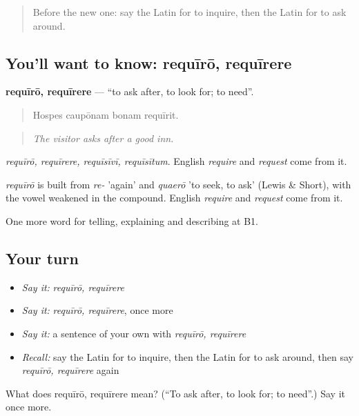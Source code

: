 \begin{quote}
Before the new one: say the Latin for to inquire, then the Latin for to ask around.
\end{quote}

\subsection*{You'll want to know: requīrō, requīrere}
\textbf{requīrō, requīrere} — \textquotedblleft{}to ask after, to look for; to need\textquotedblright{}.

\begin{quote}
Hospes caupōnam bonam requīrit.
\end{quote}

\begin{quote}
\emph{The visitor asks after a good inn.}
\end{quote}

\emph{requīrō, requīrere, requīsīvī, requīsītum}. English \emph{require} and \emph{request} come from it.

\begin{cousinweb}
\emph{requīrō} is built from \emph{re-} 'again' and \emph{quaerō} 'to seek, to ask' (Lewis \& Short), with the vowel weakened in the compound. English \emph{require} and \emph{request} come from it.
\end{cousinweb}

\begin{grammarlens}[title={What you've built}]
One more word for telling, explaining and describing at B1.
\end{grammarlens}

\subsection*{Your turn}
\begin{itemize}
\raggedright
  \item \emph{Say it:} \emph{requīrō, requīrere}
  \item \emph{Say it:} \emph{requīrō, requīrere}, once more
  \item \emph{Say it:} a sentence of your own with \emph{requīrō, requīrere}
  \item \emph{Recall:} say the Latin for to inquire, then the Latin for to ask around, then say \emph{requīrō, requīrere} again
\end{itemize}

\begin{tcolorbox}[breakable,colback=teal!4,colframe=teal!35!black,title={Before you move on}]
What does requīrō, requīrere mean? (\textquotedblleft{}To ask after, to look for; to need\textquotedblright{}.) Say it once more.
\end{tcolorbox}
